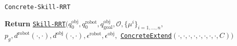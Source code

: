 \begin{algorithm}[H]
\caption{\texttt{Concrete-Skill-RRT}}\label{algo:concrete-skill-rrt}
\begin{algorithmic}[1]


    \State \textbf{Return} \hyperref[algo:Universal-skill-rrt]{\texttt{Skill-RRT}}$\big( q^{\text{obj}}_0, q^{\text{robot}}_0, q^{\text{obj}}_{\text{goal}}, \mathcal{O}, \{\mu^i\}_{i=1, \dots, n},$
    \hspace*{10em} $p_g,d^\text{robot}(\cdot, \cdot), d^\text{obj}(\cdot, \cdot), \epsilon^\text{robot}, \epsilon^\text{obj},$ 
    \hspace*{7em} \hyperref[algo:Extend]{\texttt{ConcreteExtend}}$(\cdot, \cdot,\cdot, \cdot,\cdot, \cdot,\cdot, \cdot, C) \big)$

\EndProcedure
\end{algorithmic}
\end{algorithm}

